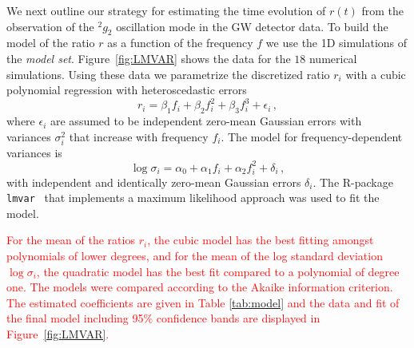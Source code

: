 We next outline our strategy for estimating the time evolution of $r(t)$
from the observation of the $\mbox{}^2g_2$ oscillation mode in the GW detector data.
To build the model of the ratio $r$ as a function of the frequency $f$ we use the 
1D simulations of the {\it model set}. Figure~\ref{fig:LMVAR}
shows the data for the $18$ numerical simulations. 
Using these data we parametrize the discretized ratio $r_i$ with a cubic polynomial
regression with heteroscedastic errors
\begin{equation}
\label{eq:model1}
r_i=\beta_1 f_i + \beta_2 f_i^2 +\beta_3 f_i^3 + \epsilon_i\,,
\end{equation}
where $\epsilon_i$ are assumed to be independent zero-mean Gaussian errors with
variances $\sigma_i^2$ that increase with frequency $f_i$. The model for frequency-dependent
variances is
\begin{equation}
\log \sigma_i=\alpha_0+ \alpha_1 f_i + \alpha_2 f_i^2 + \delta_i\,,
\end{equation}
with independent and identically zero-mean Gaussian errors $\delta_i$. The R-package \texttt{lmvar}~\citep{lmvar:2019} that implements a maximum likelihood approach was used to fit the model.

\textcolor{red}{For the mean of the ratios $r_i$, the cubic model has the best fitting amongst polynomials of lower degrees, and for the mean of the log standard deviation $\log\sigma_i$, the quadratic model has the best fit compared to a polynomial of degree one.  The models were compared according to the Akaike information criterion.  The estimated coefficients are given in Table \ref{tab:model} and the data and fit of the final model including 95\% confidence bands are displayed in
Figure~\ref{fig:LMVAR}.}

